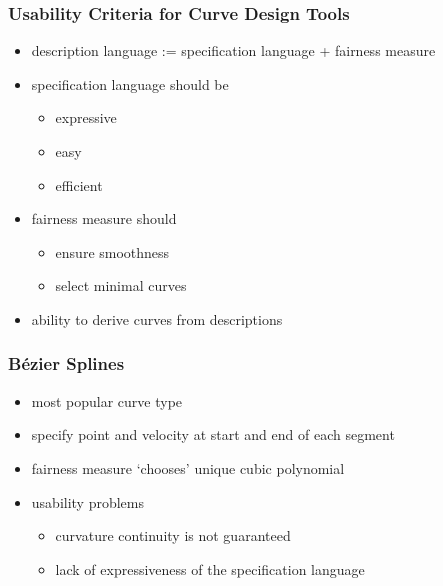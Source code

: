 \documentclass[mathserif]{beamer}
\begin{document}
		\begin{frame}
			\frametitle{Usability Criteria for Curve Design Tools}
			\begin{itemize}
				\item description language := specification language + fairness measure
				\item specification language should be
				\begin{itemize}
					\item expressive
					\item easy
					\item efficient
				\end{itemize}
				\item fairness measure should
				\begin{itemize}
					\item ensure smoothness
					\item select minimal curves
				\end{itemize}
				\item ability to derive curves from descriptions
			\end{itemize}
		\end{frame}

		\begin{frame}
			\frametitle{Bézier Splines}
			\begin{itemize}
				\item most popular curve type
				\item specify point and velocity at start and end of each segment
				\item fairness measure `chooses' unique cubic polynomial
				\item usability problems
				\begin{itemize}
					\item curvature continuity is not guaranteed
					\item lack of expressiveness of the specification language
				\end{itemize}
			\end{itemize}
		\end{frame}
\end{document}
